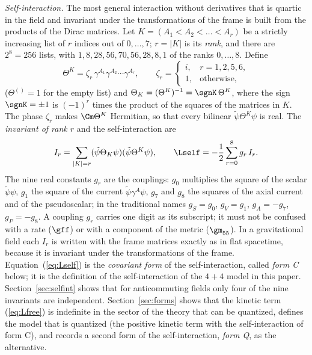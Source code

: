 \emph{Self-interaction.} The most general interaction without derivatives that is quartic in the
field and invariant under the transformations of the frame is built from the products of the Dirac
matrices. Let $K=(A_1<A_2<\dots<A_r)$ be a strictly increasing list of $r$ indices out of
$0,\dots,7$; $r=|K|$ is its \emph{rank}, and there are $2^{8}=256$ lists, with
$1,8,28,56,70,56,28,8,1$ of the ranks $0,\dots,8$. Define
\begin{equation}
\Theta^{K}=\zeta_r\,\gamma^{A_1}\gamma^{A_2}\cdots\gamma^{A_r},\qquad
\zeta_r=\begin{cases}i,&r=1,2,5,6,\\1,&\text{otherwise},\end{cases}
\label{eq:Theta}
\end{equation}
($\Theta^{()}=1$ for the empty list) and $\Theta_K=(\Theta^{K})^{-1}=\sgnK\,\Theta^{K}$, where the
sign $\sgnK=\pm1$ is $(-1)^{r}$ times the product of the squares of the matrices in $K$. The phase
$\zeta_r$ makes $\Cm\Theta^{K}$ Hermitian, so that every bilinear $\tilde\psi\Theta^{K}\psi$ is real.
The \emph{invariant of rank $r$} and the self-interaction are
\begin{equation}
I_r=\sum_{|K|=r}(\tilde\psi\Theta_K\psi)(\tilde\psi\Theta^{K}\psi),\qquad
\Lself=-\frac12\sum_{r=0}^{8}g_r\,I_r .
\label{eq:Lself}
\end{equation}
The nine real constants $g_r$ are the couplings: $g_0$ multiplies the square of the scalar
$\tilde\psi\psi$, $g_1$ the square of the current $\tilde\psi\gamma^{A}\psi$, $g_7$ and $g_8$ the
squares of the axial current and of the pseudoscalar; in the traditional names $g_S=g_0$, $g_V=g_1$,
$g_A=-g_7$, $g_P=-g_8$. A coupling $g_r$ carries one digit as its subscript; it must not be confused
with a rate ($\gff$) or with a component of the metric ($\gm_{55}$). In a gravitational field each
$I_r$ is written with the frame matrices exactly as in flat spacetime, because it is invariant under
the transformations of the frame. Equation~(\ref{eq:Lself}) is the \emph{covariant form} of the
self-interaction, called \emph{form C} below; it is the definition of the self-interaction of the
$4+4$ model in this paper. Section~\ref{sec:selfint} shows that for anticommuting fields only four of
the nine invariants are independent. Section~\ref{sec:forms} shows that the kinetic term
(\ref{eq:Lfree}) is indefinite in the sector of the theory that can be quantized, defines the model
that is quantized (the positive kinetic term with the self-interaction of form C), and records a
second form of the self-interaction, \emph{form Q}, as the alternative.


